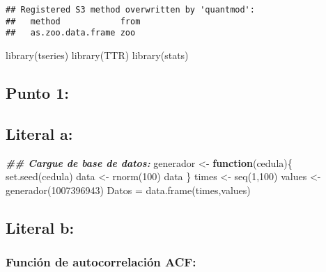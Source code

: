 \documentclass[
]{article}
\newenvironment{Shaded}{\begin{snugshade}}{\end{snugshade}}
\newcommand{\ControlFlowTok}[1]{\textcolor[rgb]{0.13,0.29,0.53}{\textbf{#1}}}
\newcommand{\DecValTok}[1]{\textcolor[rgb]{0.00,0.00,0.81}{#1}}
\newcommand{\DocumentationTok}[1]{\textcolor[rgb]{0.56,0.35,0.01}{\textbf{\textit{#1}}}}
\newcommand{\FunctionTok}[1]{\textcolor[rgb]{0.00,0.00,0.00}{#1}}
\newcommand{\NormalTok}[1]{#1}
\newcommand{\OtherTok}[1]{\textcolor[rgb]{0.56,0.35,0.01}{#1}}
\begin{document}
\begin{verbatim}
## Registered S3 method overwritten by 'quantmod':
##   method            from
##   as.zoo.data.frame zoo
\end{verbatim}

\begin{Shaded}
\begin{Highlighting}[]
\FunctionTok{library}\NormalTok{(tseries)}
\FunctionTok{library}\NormalTok{(TTR)}
\FunctionTok{library}\NormalTok{(stats)}
\end{Highlighting}
\end{Shaded}

\hypertarget{punto-1}{%
\subsection{Punto 1:}\label{punto-1}}

\hypertarget{literal-a}{%
\subsection{Literal a:}\label{literal-a}}

\begin{Shaded}
\begin{Highlighting}[]
\DocumentationTok{\#\# Cargue de base de datos: }
\NormalTok{generador }\OtherTok{\textless{}{-}} \ControlFlowTok{function}\NormalTok{(cedula)\{}
\FunctionTok{set.seed}\NormalTok{(cedula)}
\NormalTok{data }\OtherTok{\textless{}{-}} \FunctionTok{rnorm}\NormalTok{(}\DecValTok{100}\NormalTok{)}
\NormalTok{data}
\NormalTok{\}}
\NormalTok{times }\OtherTok{\textless{}{-}} \FunctionTok{seq}\NormalTok{(}\DecValTok{1}\NormalTok{,}\DecValTok{100}\NormalTok{)}
\NormalTok{values }\OtherTok{\textless{}{-}} \FunctionTok{generador}\NormalTok{(}\DecValTok{1007396943}\NormalTok{)}
\NormalTok{Datos }\OtherTok{=} \FunctionTok{data.frame}\NormalTok{(times,values)}
\end{Highlighting}
\end{Shaded}

\hypertarget{literal-b}{%
\subsection{Literal b:}\label{literal-b}}

\hypertarget{funciuxf3n-de-autocorrelaciuxf3n-acf}{%
\subsubsection{Función de autocorrelación
ACF:}\label{funciuxf3n-de-autocorrelaciuxf3n-acf}}
\end{document}
